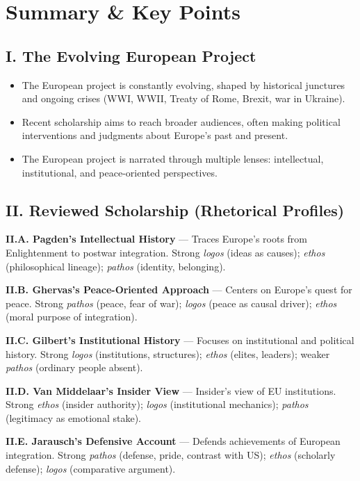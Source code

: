 \documentclass[11pt,a4paper]{article}
\begin{document}
\section*{Summary \& Key Points}

\subsection*{I. The Evolving European Project}

\begin{itemize}
\item The European project is constantly evolving, shaped by historical junctures and ongoing crises (WWI, WWII, Treaty of Rome, Brexit, war in Ukraine).
\item Recent scholarship aims to reach broader audiences, often making political interventions and judgments about Europe's past and present.
\item The European project is narrated through multiple lenses: intellectual, institutional, and peace-oriented perspectives.
\end{itemize}

\subsection*{II. Reviewed Scholarship (Rhetorical Profiles)}

\textbf{II.A. Pagden's Intellectual History} --- Traces Europe's roots from Enlightenment to postwar integration. Strong \textit{logos} (ideas as causes); \textit{ethos} (philosophical lineage); \textit{pathos} (identity, belonging).

\textbf{II.B. Ghervas's Peace-Oriented Approach} --- Centers on Europe's quest for peace. Strong \textit{pathos} (peace, fear of war); \textit{logos} (peace as causal driver); \textit{ethos} (moral purpose of integration).

\textbf{II.C. Gilbert's Institutional History} --- Focuses on institutional and political history. Strong \textit{logos} (institutions, structures); \textit{ethos} (elites, leaders); weaker \textit{pathos} (ordinary people absent).

\textbf{II.D. Van Middelaar's Insider View} --- Insider's view of EU institutions. Strong \textit{ethos} (insider authority); \textit{logos} (institutional mechanics); \textit{pathos} (legitimacy as emotional stake).

\textbf{II.E. Jarausch's Defensive Account} --- Defends achievements of European integration. Strong \textit{pathos} (defense, pride, contrast with US); \textit{ethos} (scholarly defense); \textit{logos} (comparative argument).
\end{document}
